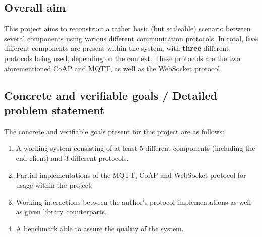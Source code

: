 \subsection{Overall aim}
\label{ch:intro:overall-aim}

This project aims to reconstruct a rather basic (but scaleable) scenario between several components using various different communication protocols. In total, \textbf{five} different components are present within the system, with \textbf{three} different protocols being used, depending on the context. These protocols are the two aforementioned CoAP and MQTT, as well as the WebSocket protocol.

\iffalse
(Choose one of the headline alternatives.) The project's aim is an insightful description of the direction in which you want to work, your hopes with regards to the possible outcomes of the project, and of the projects' purpose. The hypothesis does not need to be clearly defined or concrete. It can be an objective which may or may not be resolved or achieved with any degree of certainty. It can be a problem formula of a high level, which cannot be answered by the study's diagrams, tables and other objective results, but which can be discussed in the report's concluding chapter.

Examples: “the project's overall aim is to gain new knowledge within the organization about… ”. “The project's aim is to identify the general valid principles for the connection between parameter X and Y for everybody…”. “The project's aim is to find new technical solutions to problems in the following area: ….” “The project's aim is to compare technology A with technology B as a solution to the needs of C.” “The project aims to present a decision-making basis for…” “The project aims to investigate whether or not it is realistic to expect that technology A could be used for purpose B in the future.”
\fi

\subsection{Concrete and verifiable goals / Detailed problem statement}
\label{ch:intro:verifiable-goals}

The concrete and verifiable goals present for this project are as follows:

\begin{enumerate}
	\item A working system consisting of at least 5 different components (including the end client) and 3 different protocols.
	\item Partial implementations of the MQTT, CoAP and WebSocket protocol for usage within the project.
	\item Working interactions between the author's protocol implementations as well as given library counterparts.
	\item A benchmark able to assure the quality of the system.
\end{enumerate}

